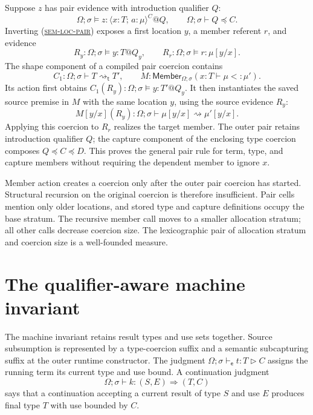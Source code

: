 \documentclass[acmsmall,screen,nonacm]{acmart}
\newcommand{\ruleref}[1]{%
  \textsc{(\hyperref[rule:#1]{#1})}}
\newcommand{\capt}[2]{#1^{#2}}
\newcommand{\pairshape}[4]{\langle #1\!:\!#2;\,#3\!:\!#4\rangle}
\newcommand{\subst}[3]{#1[#2/#3]}
\newcommand{\uses}{\mathbin{\triangleright}}
\newcommand{\tcoerce}{\mathrel{\rightsquigarrow_{\mathsf t}}}
\newcommand{\coerce}{\mathrel{\rightsquigarrow}}
\newcommand{\semleq}{\mathrel{\preceq}}
\newcommand{\rulesetup}{%
  \small
  \smallrulenames
  \setlength{\afterruleskip}{1.45em plus 0.2em minus 0.1em}%
  \setlength{\labelminsep}{0.65em}%
  \renewcommand{\arraystretch}{1.15}%
  \renewcommand{\andalso}{\qquad}%
}
\begin{document}
Suppose \(z\) has pair evidence with introduction qualifier \(Q\):
\[
 \Omega;\sigma\models
 z:\capt{\pairshape{x}{T}{a}{\mu}}{C}@Q,
 \qquad
 \Omega;\sigma\vdash Q\semleq C.
\]
Inverting \ruleref{sem-loc-pair} exposes a first location \(y\), a member
referent \(r\), and evidence
\[
 R_y:\Omega;\sigma\models y:T@Q_y,
 \qquad
 R_r:\Omega;\sigma\models r:\subst{\mu}{y}{x}.
\]
The shape component of a compiled pair coercion contains
\[
 C_1:\Omega;\sigma\vdash T\tcoerce T',
 \qquad
 M:\mathsf{Member}_{\Omega;\sigma}(x:T\vdash\mu<:\mu').
\]
Its action first obtains
\(C_1(R_y):\Omega;\sigma\models y:T'@Q_y\).  It then instantiates the saved
source premise in \(M\) with the same location \(y\), using the source
evidence \(R_y\):
\[
 M[y/x](R_y):
 \Omega;\sigma\vdash
 \subst{\mu}{y}{x}\coerce\subst{\mu'}{y}{x}.
\]
Applying this coercion to \(R_r\) realizes the target member.  The outer pair
retains introduction qualifier \(Q\); the capture component of the enclosing
type coercion composes \(Q\semleq C\semleq D\).  This proves the general pair
rule for term, type, and capture members without requiring the dependent
member to ignore \(x\).

Member action creates a coercion only after the outer pair coercion has
started.  Structural recursion on the original coercion is therefore
insufficient.  Pair cells mention only older locations, and stored type and
capture definitions occupy the base stratum.  The recursive member call
moves to a smaller allocation stratum; all other calls decrease coercion
size.  The lexicographic pair of allocation stratum and coercion size is a
well-founded measure.

\section{The qualifier-aware machine invariant}
\label{sec:invariant}

The machine invariant retains result types and use sets together.  Source
subsumption is represented by a type-coercion suffix and a semantic
subcapturing suffix at the outer runtime constructor.  The judgment
\(\Omega;\sigma\vdash_{\mathsf e}t:T\uses C\) assigns the running term its
current type and use bound.  A continuation judgment
\[
 \Omega;\sigma\vdash k:(S,E)\Rightarrow(T,C)
\]
says that a continuation accepting a current result of type \(S\) and use
\(E\) produces final type \(T\) with use bounded by \(C\).

\begingroup
\setlength{\abovedisplayskip}{5pt plus 1pt minus 1pt}
\setlength{\belowdisplayskip}{5pt plus 1pt minus 1pt}
\setlength{\intextsep}{5pt}
\captionsetup{skip=6pt}
\rulesetup
\end{document}
